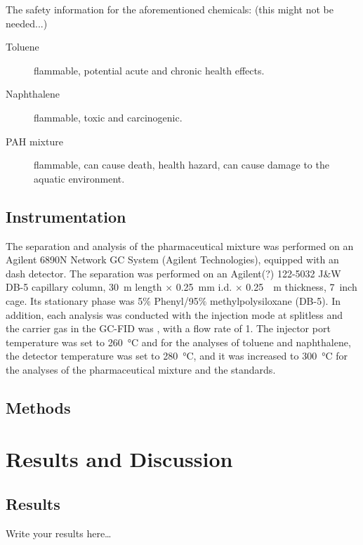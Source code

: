 \documentclass[a4paper, 12pt]{article}
\begin{document}
The safety information for the aforementioned chemicals: (this might not be needed...)
\begin{description}
	\item[Toluene] flammable, potential acute and chronic health effects.
	\item[Naphthalene] flammable, toxic and carcinogenic.
	\item[PAH mixture] flammable, can cause death, health hazard, can cause damage to the aquatic environment.
\end{description}

\subsection{Instrumentation}
The separation and analysis of the pharmaceutical mixture was performed on an Agilent 6890N Network GC System (Agilent Technologies), equipped with an dash detector. The separation was performed on an Agilent(?) 122-5032 J\&W DB-5 capillary column, \SI{30}{m} length $\times$ \SI{0.25}{mm} i.d. $\times$ \SI{0.25}{\mu{}m} thickness, \SI{7}{inch} cage. Its stationary phase was 5$\%$ Phenyl/95$\%$ methylpolysiloxane (DB-5). In addition, each analysis was conducted with the injection mode at splitless and the carrier gas in the GC-FID was , with a flow rate of \SI{1}{}. The injector port temperature was set to \SI{260}{\degreeCelsius} and for the analyses of toluene and naphthalene, the detector temperature was set to \SI{280}{\degreeCelsius}, and it was increased to \SI{300}{\degreeCelsius} for the analyses of the pharmaceutical mixture and the standards.

\subsection{Methods}



\section{Results and Discussion}

\subsection{Results}
Write your results here\ldots
\end{document}
